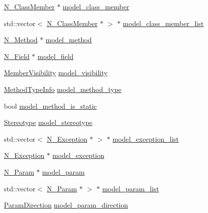 \begin{DoxyCompactItemize}
\item 
\hyperlink{classN__ClassMember}{N\+\_\+\+Class\+Member} $\ast$ \hyperlink{unionYYSTYPE_aab8ffd3479e64f4f952a8b229c4c7c5a}{model\+\_\+class\+\_\+member}
\item 
std\+::vector$<$ \hyperlink{classN__ClassMember}{N\+\_\+\+Class\+Member} $\ast$ $>$ $\ast$ \hyperlink{unionYYSTYPE_a1bf423ad9f460d4e74c00bb8670eaae8}{model\+\_\+class\+\_\+member\+\_\+list}
\item 
\hyperlink{classN__Method}{N\+\_\+\+Method} $\ast$ \hyperlink{unionYYSTYPE_a942a640237407a4473209637bb4e8875}{model\+\_\+method}
\item 
\hyperlink{classN__Field}{N\+\_\+\+Field} $\ast$ \hyperlink{unionYYSTYPE_af2e876cf0d3eea8c18d7a91f3639ad8b}{model\+\_\+field}
\item 
\hyperlink{ast_8h_a8cf536792064de0e4fc620bc6f1dc90e}{Member\+Visibility} \hyperlink{unionYYSTYPE_ab17b1393dae8de54663649a094da13ed}{model\+\_\+visibility}
\item 
\hyperlink{structMethodTypeInfo}{Method\+Type\+Info} \hyperlink{unionYYSTYPE_ad9e7689680a21064dcf7e957194c83fc}{model\+\_\+method\+\_\+type}
\item 
bool \hyperlink{unionYYSTYPE_a19de40e9bab839895eb0b143194367dc}{model\+\_\+method\+\_\+is\+\_\+static}
\item 
\hyperlink{ast_8h_a6e3e364b8758e35526082aefa26d3596}{Stereotype} \hyperlink{unionYYSTYPE_af24face112bb5754e94b4fd2b0c666c1}{model\+\_\+stereotype}
\item 
std\+::vector$<$ \hyperlink{classN__Exception}{N\+\_\+\+Exception} $\ast$ $>$ $\ast$ \hyperlink{unionYYSTYPE_a04dfac3d4b5c7515b14c1b8971eed3d4}{model\+\_\+exception\+\_\+list}
\item 
\hyperlink{classN__Exception}{N\+\_\+\+Exception} $\ast$ \hyperlink{unionYYSTYPE_a713476977a927a84863073eb5025ed91}{model\+\_\+exception}
\item 
\hyperlink{classN__Param}{N\+\_\+\+Param} $\ast$ \hyperlink{unionYYSTYPE_ae48a50d0b50d47f49c22d92a1d648d64}{model\+\_\+param}
\item 
std\+::vector$<$ \hyperlink{classN__Param}{N\+\_\+\+Param} $\ast$ $>$ $\ast$ \hyperlink{unionYYSTYPE_a6eb4e2ebafb8f2fbb80f8d8cf51d3bae}{model\+\_\+param\+\_\+list}
\item 
\hyperlink{ast_8h_af1bb1892f9e576501ff47410367569a7}{Param\+Direction} \hyperlink{unionYYSTYPE_a000fd2ef5a9eeffa92a050ae325a170d}{model\+\_\+param\+\_\+direction}
\end{DoxyCompactItemize}


